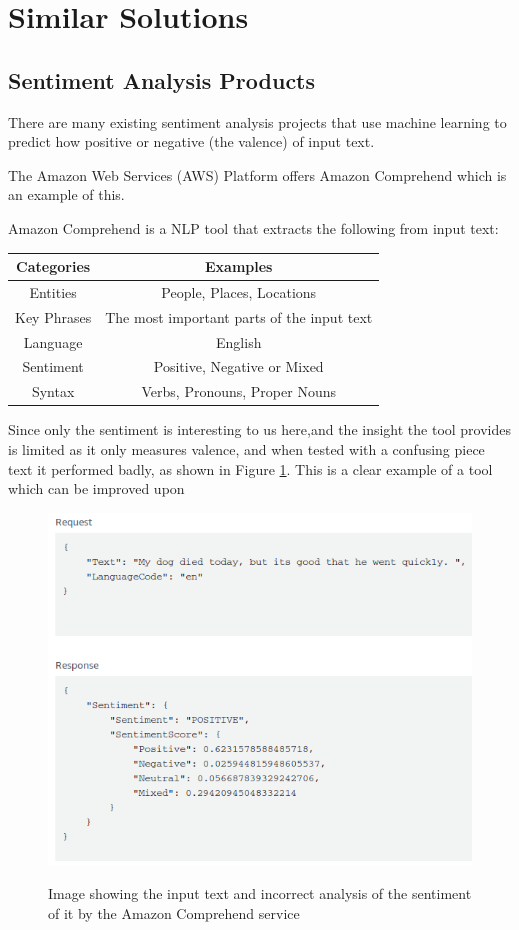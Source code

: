 
\section{Similar Solutions}

\subsection{Sentiment Analysis Products}
There are many existing sentiment analysis projects that use machine learning to predict how positive or negative (the valence) of input text.

The Amazon Web Services (AWS) Platform offers Amazon Comprehend \cite{aws} which is an example of this. 

Amazon Comprehend is a NLP tool that extracts the following from input text:
\begin{center}
\begin{tabular}{ |c|c| } 
 \hline
  Categories & Examples \\ 
 \hline                        
 Entities & People, Places, Locations\\
 Key Phrases & The most important parts of the input text \\
 Language & English \\
 Sentiment & Positive, Negative or Mixed \\
 Syntax & Verbs, Pronouns, Proper Nouns \\
 \hline
\end{tabular}
\end{center}

Since only the sentiment is interesting to us here,and the insight the tool provides is limited as it only measures valence, and when tested with a confusing piece text it performed badly, as shown in Figure \ref{aws:sentiment}. This is a clear example of a tool which can be improved upon

\begin{figure}[ht]
\caption{Image showing the input text and incorrect analysis of the sentiment of it by the Amazon Comprehend service}
\centering
\includegraphics[scale=0.5]{./LitReview/images/comphrendResult.png}
\label{aws:sentiment}
\end{figure}


